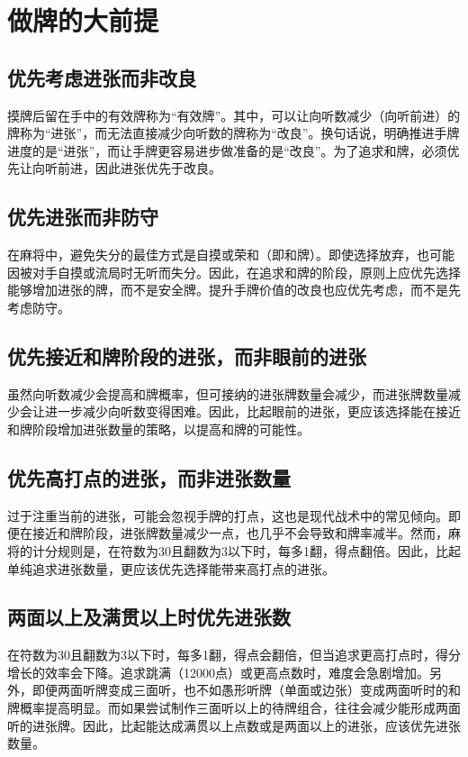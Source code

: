 \chapter{做牌的大前提}
\section{优先考虑进张而非改良}\label{做牌法则1}

摸牌后留在手中的有效牌称为“有效牌”。其中，可以让向听数减少（向听前进）的牌称为“进张”，而无法直接减少向听数的牌称为“改良”。换句话说，明确推进手牌进度的是“进张”，而让手牌更容易进步做准备的是“改良”。为了追求和牌，必须优先让向听前进，因此进张优先于改良。

\section{优先进张而非防守}\label{做牌法则2}
在麻将中，避免失分的最佳方式是自摸或荣和（即和牌）。即使选择放弃，也可能因被对手自摸或流局时无听而失分。因此，在追求和牌的阶段，原则上应优先选择能够增加进张的牌，而不是安全牌。提升手牌价值的改良也应优先考虑，而不是先考虑防守。

\section{优先接近和牌阶段的进张，而非眼前的进张}
虽然向听数减少会提高和牌概率，但可接纳的进张牌数量会减少，而进张牌数量减少会让进一步减少向听数变得困难。因此，比起眼前的进张，更应该选择能在接近和牌阶段增加进张数量的策略，以提高和牌的可能性。

\section{优先高打点的进张，而非进张数量}\label{做牌法则4}
过于注重当前的进张，可能会忽视手牌的打点，这也是现代战术中的常见倾向。即便在接近和牌阶段，进张牌数量减少一点，也几乎不会导致和牌率减半。然而，麻将的计分规则是，在符数为30且翻数为3以下时，每多1翻，得点翻倍。因此，比起单纯追求进张数量，更应该优先选择能带来高打点的进张。

\section{两面以上及满贯以上时优先进张数}
在符数为30且翻数为3以下时，每多1翻，得点会翻倍，但当追求更高打点时，得分增长的效率会下降。追求跳满（12000点）或更高点数时，难度会急剧增加。另外，即便两面听牌变成三面听，也不如愚形听牌（单面或边张）变成两面听时的和牌概率提高明显。而如果尝试制作三面听以上的待牌组合，往往会减少能形成两面听的进张牌。因此，比起能达成满贯以上点数或是两面以上的进张，应该优先进张数量。